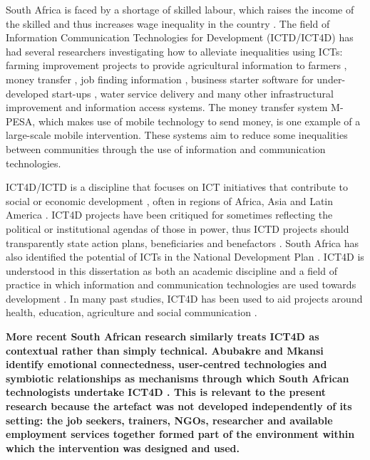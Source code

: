 South Africa is faced by a shortage of skilled labour, which raises the income of the skilled and thus increases wage inequality in the country \cite{npc2012}. The field of Information Communication Technologies for Development (ICTD/ICT4D) has had several researchers investigating how to alleviate inequalities using ICTs: farming improvement projects to provide agricultural information to farmers \cite{gandhi2007}, money transfer \cite{dyson2007}, job finding information \cite{qiang2012,chepken2012tele}, business starter software for under-developed start-ups \cite{brittan2011}, water service delivery \cite{ssozi2016} and many other infrastructural improvement and information access systems. The money transfer system M-PESA, which makes use of mobile technology to send money, is one example of a large-scale mobile intervention. These systems aim to reduce some inequalities between communities through the use of information and communication technologies.

ICT4D/ICTD is a discipline that focuses on ICT initiatives that contribute to social or economic development \cite{chepken2012trends}, often in regions of Africa, Asia and Latin America \cite{chepken2012trends}. ICT4D projects have been critiqued for sometimes reflecting the political or institutional agendas of those in power, thus ICTD projects should transparently state action plans, beneficiaries and benefactors \cite{elkhatib2015}. South Africa has also identified the potential of ICTs in the National Development Plan \cite{npc2012}. ICT4D is understood in this dissertation as both an academic discipline and a field of practice in which information and communication technologies are used towards development \cite{chepken2012trends}. In many past studies, ICT4D has been used to aid projects around health, education, agriculture and social communication \cite{david2013,chepken2012trends}.

\textbf{More recent South African research similarly treats ICT4D as contextual rather than simply technical. Abubakre and Mkansi identify emotional connectedness, user-centred technologies and symbiotic relationships as mechanisms through which South African technologists undertake ICT4D \cite{abubakre2022}. This is relevant to the present research because the artefact was not developed independently of its setting: the job seekers, trainers, NGOs, researcher and available employment services together formed part of the environment within which the intervention was designed and used.}


